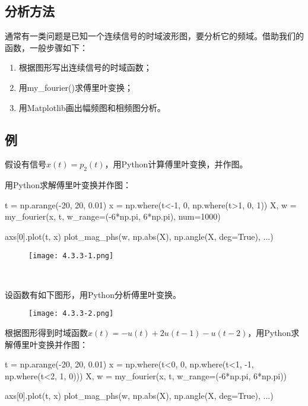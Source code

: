 \subsection{分析方法}

通常有一类问题是已知一个连续信号的时域波形图，要分析它的频域。借助我们的函数，一般步骤如下：
\begin{enumerate}
    \item 根据图形写出连续信号的时域函数；
    \item 用my\_fourier()求傅里叶变换；
    \item 用Matplotlib画出幅频图和相频图分析。
\end{enumerate}

\subsection{例}

\begin{example}
假设有信号$x\left( t \right) =p_2\left( t \right) $，用Python计算傅里叶变换，并作图。
\end{example}

用Python求解傅里叶变换并作图：

\begin{python}
t    = np.arange(-20, 20, 0.01)
x    = np.where(t<-1, 0, np.where(t>1, 0, 1))
X, w = my_fourier(x, t, w_range=(-6*np.pi, 6*np.pi), num=1000)

axs[0].plot(t, x)
plot_mag_phs(w, np.abs(X), np.angle(X, deg=True), ...)
\end{python}

\begin{figure}[h]
\centering
\texttt{[image: 4.3.3-1.png]}
\end{figure}

~

\begin{example}
设函数有如下图形，用Python分析傅里叶变换。
\begin{figure}[h]
\centering
\texttt{[image: 4.3.3-2.png]}
\end{figure}
\end{example}

根据图形得到时域函数$x\left( t \right) =-u\left( t \right) +2u\left( t-1 \right) -u\left( t-2 \right) $，用Python求解傅里叶变换并作图：

\begin{python}
t    = np.arange(-20, 20, 0.01)
x    = np.where(t<0, 0, np.where(t<1, -1, np.where(t<2, 1, 0)))
X, w = my_fourier(x, t, w_range=(-6*np.pi, 6*np.pi))

axs[0].plot(t, x)
plot_mag_phs(w, np.abs(X), np.angle(X, deg=True), ...)
\end{python}


